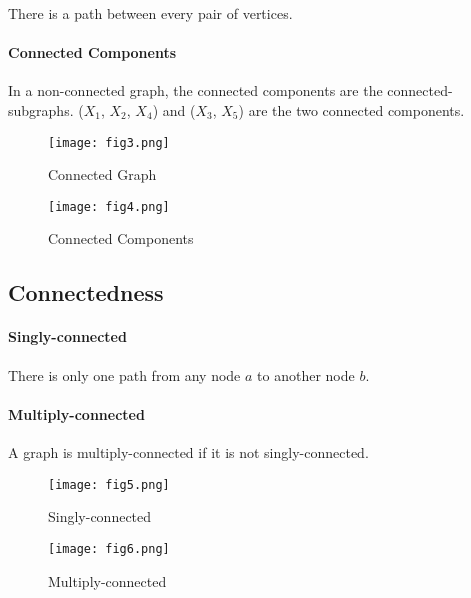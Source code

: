There is a path between every pair of vertices.

\paragraph{Connected Components}

In a non-connected graph, the connected components are the connected-subgraphs. ($X_1$, $X_2$, $X_4$) and ($X_3$, $X_5$) are the two connected components.
\begin{figure*}[h]
	\centering
	\begin{subfigure}[b]{0.45\textwidth}
		\centering
		\texttt{[image: fig3.png]}
		\caption*{Connected Graph}
	\end{subfigure}
	\begin{subfigure}[b]{0.45\textwidth}
		\centering
		\texttt{[image: fig4.png]}
		\caption*{Connected Components}
	\end{subfigure}
\end{figure*}

\subsection{Connectedness}

\paragraph{Singly-connected}

There is only one path from any node $a$ to another node $b$.

\paragraph{Multiply-connected}

A graph is multiply-connected if it is not singly-connected.
\begin{figure*}[h]
	\centering
	\begin{subfigure}[b]{0.45\textwidth}
		\centering
		\texttt{[image: fig5.png]}
		\caption*{Singly-connected}
	\end{subfigure}
	\begin{subfigure}[b]{0.45\textwidth}
		\centering
		\texttt{[image: fig6.png]}
		\caption*{Multiply-connected}
	\end{subfigure}
\end{figure*}



